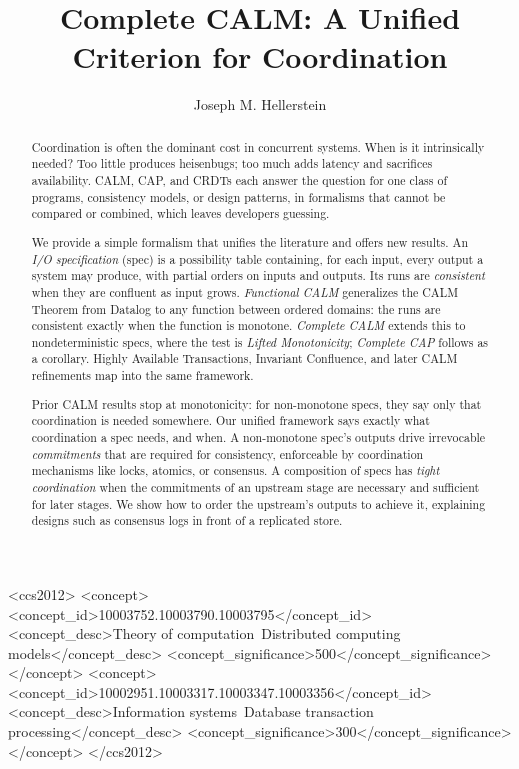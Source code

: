 \documentclass[sigconf]{cidr-2027}
\theoremstyle{remark}
\newcommand{\commitments}{commitments\xspace}
\newcommand{\spectype}[1][]{I/O specification#1\xspace}
\begin{document}
\title{Complete CALM: A Unified Criterion for Coordination}

\author{Joseph M. Hellerstein}

\begin{abstract}
Coordination is often the dominant cost in concurrent systems. When is it
intrinsically needed? Too little
produces heisenbugs; too much adds latency and sacrifices
availability.  CALM, CAP, and CRDTs each answer the question for one class of
programs, consistency models, or design patterns, in formalisms that cannot be
compared or combined, which leaves developers guessing.

We provide a simple formalism that unifies the literature and
offers new results.  An \emph{\spectype} (spec) is a possibility table containing, for
each input, every output a system may produce, with partial orders on inputs and
outputs.  Its runs are \emph{consistent} when they are confluent as input grows.
\emph{Functional CALM} generalizes the CALM Theorem from Datalog to any function
between ordered domains: the runs are consistent exactly when the function is
monotone.  \emph{Complete CALM}
extends this to nondeterministic specs, where the test is
\emph{Lifted Monotonicity}; \emph{Complete CAP} follows as a corollary.
Highly Available Transactions, Invariant Confluence, and later CALM refinements map into the same framework.

Prior CALM results stop at monotonicity: for non-monotone
specs, they say only that coordination is needed somewhere.  Our
unified framework says exactly
what coordination a spec needs, and when.  A non-monotone
spec's outputs drive irrevocable \emph{\commitments} that are required for consistency,
enforceable by coordination mechanisms like locks, atomics, or consensus.
A composition of specs has \emph{tight coordination} when the \commitments of an upstream stage 
are necessary and sufficient for later stages.
We show how to order the upstream's outputs to achieve it, explaining designs such
as consensus logs in front of a replicated store.
\end{abstract}

\begin{CCSXML}
<ccs2012>
<concept>
<concept_id>10003752.10003790.10003795</concept_id>
<concept_desc>Theory of computation~Distributed computing models</concept_desc>
<concept_significance>500</concept_significance>
</concept>
<concept>
<concept_id>10002951.10003317.10003347.10003356</concept_id>
<concept_desc>Information systems~Database transaction processing</concept_desc>
<concept_significance>300</concept_significance>
</concept>
</ccs2012>
\end{CCSXML}
\end{document}
